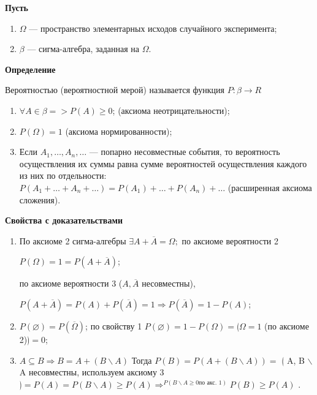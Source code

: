 \textbf{Пусть} 

\begin{enumerate}
	\item $\Omega$ --- пространство элементарных исходов случайного эксперимента;
	\item $\beta$ --- сигма-алгебра, заданная на $\Omega$.
\end{enumerate}

\textbf{Определение}

Вероятностью (вероятностной мерой) называется функция $P: \beta \rightarrow R$

\begin{enumerate}
	\item $\forall A \in \beta => P(A) \geqslant 0$; (аксиома неотрицательности);
	\item $P(\Omega) = 1$ (аксиома нормированности);
	\item Если $A_1, \dots, A_n, \dots$ --- попарно несовместные события, то вероятность осуществления их суммы равна сумме вероятностей осуществления каждого из них по отдельности: $P(A_1 + \dots + A_n + \dots) = P(A_1) + \dots + P(A_n) + \dots$ (расширенная аксиома сложения). 
\end{enumerate}

\textbf{Свойства с доказательствами}

\begin{enumerate}
	\item По аксиоме 2 сигма-алгебры $\exists A + \overline{A} = \Omega; $ по аксиоме вероятности 2 
	
	$P(\Omega) = 1 = P(A + \overline{A})$; 
	
	по аксиоме вероятности 3 ($A, \overline{A}$ несовместны), 
	
	$P(A + \overline{A}) = P(A) + P(\overline{A}) = 1 \Rightarrow P(\overline{A}) = 1 - P(A)$;
	
	\item $P(\varnothing) = P(\overline{\Omega})$; по свойству 1 $P(\varnothing) = 1 - P(\Omega) = \lgroup \Omega=1$ (по аксиоме 2)$\rgroup = 0$;
	
	\item $A \subseteq B \Rightarrow B = A + (B \backslash A)$ Тогда $P(B) = P(A + (B \backslash A)) =$ $\lgroup$ A, B $\backslash$ A несовместны, используем аксиому 3$\rgroup = P(A) = P(B \backslash A) \geqslant P(A) \Rightarrow^{{P(B\backslash A \geqslant 0 \text{по акс. 1})}} P(B) \geqslant P(A)$ .

\end{enumerate}

